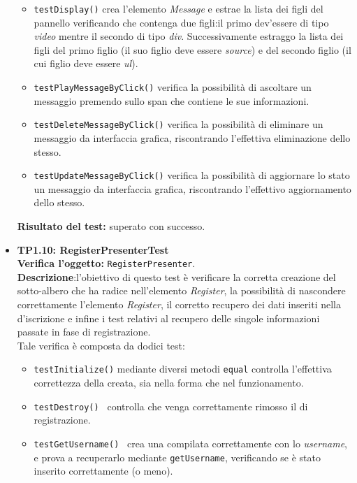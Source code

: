 \begin{itemize}
\begin{itemize}
\item \texttt{testDisplay()} crea l'elemento \textit{Message} e estrae la lista dei figli del pannello verificando che contenga due figli:il primo dev'essere di tipo \textit{video} mentre il secondo di tipo \textit{div}.
Successivamente estraggo la lista dei figli del primo figlio (il suo figlio deve essere \textit{source}) e del secondo figlio (il cui figlio deve essere \textit{ul}).

\item \texttt{testPlayMessageByClick()} verifica la possibilità di ascoltare un messaggio premendo sullo span che contiene le sue informazioni.

\item \texttt{testDeleteMessageByClick()} verifica la possibilità di eliminare un messaggio da interfaccia grafica, riscontrando l'effettiva eliminazione dello stesso.

\item \texttt{testUpdateMessageByClick()} verifica la possibilità di aggiornare lo stato un messaggio da interfaccia grafica, riscontrando l'effettivo aggiornamento dello stesso.

\end{itemize}
\textbf{Risultato del test:} superato con successo.

\item \textbf{TP1.10: RegisterPresenterTest}\\
\textbf{Verifica l'oggetto:} \texttt{RegisterPresenter}.\\
\textbf{Descrizione}:l'obiettivo di questo test è verificare la corretta creazione del sotto-albero che ha radice nell'elemento \textit{Register}, la possibilità di nascondere correttamente l'elemento \textit{Register}, il corretto recupero dei dati inseriti nella  d'iscrizione e infine i test relativi al recupero delle singole informazioni passate in fase di registrazione.\\
Tale verifica è composta da dodici test:
\begin{itemize}

\item \texttt{testInitialize()} mediante diversi metodi \texttt{equal} controlla l'effettiva correttezza della  creata, sia nella forma che nel funzionamento.

\item \texttt{testDestroy() } controlla che venga correttamente rimosso il  di registrazione.

\item \texttt{testGetUsername() } crea una  compilata correttamente con lo \textit{username}, e prova a recuperarlo mediante \texttt{getUsername}, verificando se è stato inserito correttamente (o meno).


\end{itemize}
\end{itemize}
